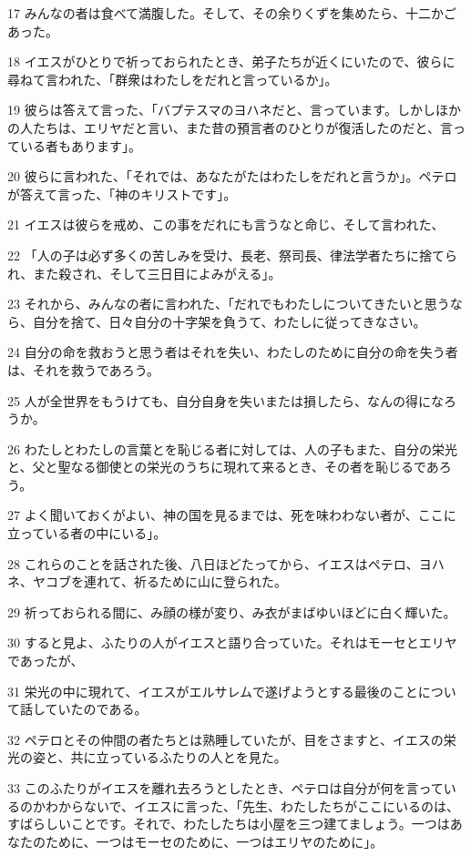 \par 17 みんなの者は食べて満腹した。そして、その余りくずを集めたら、十二かごあった。
\par 18 イエスがひとりで祈っておられたとき、弟子たちが近くにいたので、彼らに尋ねて言われた、「群衆はわたしをだれと言っているか」。
\par 19 彼らは答えて言った、「バプテスマのヨハネだと、言っています。しかしほかの人たちは、エリヤだと言い、また昔の預言者のひとりが復活したのだと、言っている者もあります」。
\par 20 彼らに言われた、「それでは、あなたがたはわたしをだれと言うか」。ペテロが答えて言った、「神のキリストです」。
\par 21 イエスは彼らを戒め、この事をだれにも言うなと命じ、そして言われた、
\par 22 「人の子は必ず多くの苦しみを受け、長老、祭司長、律法学者たちに捨てられ、また殺され、そして三日目によみがえる」。
\par 23 それから、みんなの者に言われた、「だれでもわたしについてきたいと思うなら、自分を捨て、日々自分の十字架を負うて、わたしに従ってきなさい。
\par 24 自分の命を救おうと思う者はそれを失い、わたしのために自分の命を失う者は、それを救うであろう。
\par 25 人が全世界をもうけても、自分自身を失いまたは損したら、なんの得になろうか。
\par 26 わたしとわたしの言葉とを恥じる者に対しては、人の子もまた、自分の栄光と、父と聖なる御使との栄光のうちに現れて来るとき、その者を恥じるであろう。
\par 27 よく聞いておくがよい、神の国を見るまでは、死を味わわない者が、ここに立っている者の中にいる」。
\par 28 これらのことを話された後、八日ほどたってから、イエスはペテロ、ヨハネ、ヤコブを連れて、祈るために山に登られた。
\par 29 祈っておられる間に、み顔の様が変り、み衣がまばゆいほどに白く輝いた。
\par 30 すると見よ、ふたりの人がイエスと語り合っていた。それはモーセとエリヤであったが、
\par 31 栄光の中に現れて、イエスがエルサレムで遂げようとする最後のことについて話していたのである。
\par 32 ペテロとその仲間の者たちとは熟睡していたが、目をさますと、イエスの栄光の姿と、共に立っているふたりの人とを見た。
\par 33 このふたりがイエスを離れ去ろうとしたとき、ペテロは自分が何を言っているのかわからないで、イエスに言った、「先生、わたしたちがここにいるのは、すばらしいことです。それで、わたしたちは小屋を三つ建てましょう。一つはあなたのために、一つはモーセのために、一つはエリヤのために」。
